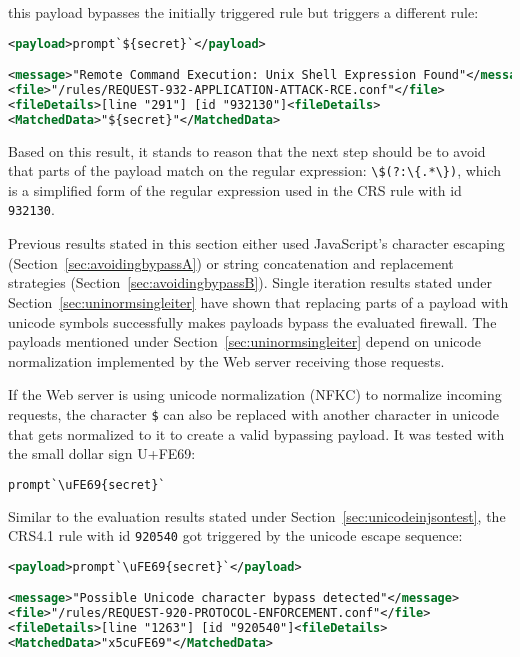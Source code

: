 this payload bypasses the initially triggered rule but triggers a different rule:

\begin{lstlisting}[style=ruleStyle, language=XML]
<payload>prompt`${secret}`</payload>

<message>"Remote Command Execution: Unix Shell Expression Found"</message>
<file>"/rules/REQUEST-932-APPLICATION-ATTACK-RCE.conf"</file>
<fileDetails>[line "291"] [id "932130"]<fileDetails>
<MatchedData>"${secret}"</MatchedData>
\end{lstlisting}

Based on this result, it stands to reason that the next step should be to avoid that parts of the payload match on the regular expression: \verb|\$(?:\{.*\})|, which is a simplified form of the regular expression used in the CRS rule with id \verb|932130|.

Previous results stated in this section either used JavaScript's character escaping (Section~\ref{sec:avoidingbypassA}) or string concatenation and replacement strategies (Section~\ref{sec:avoidingbypassB}). Single iteration results stated under Section~\ref{sec:uninormsingleiter} have shown that replacing parts of a payload with unicode symbols successfully makes payloads bypass the evaluated firewall. The payloads mentioned under Section~\ref{sec:uninormsingleiter} depend on unicode normalization implemented by the Web server receiving those requests. 

If the Web server is using unicode normalization (NFKC) to normalize incoming requests, the character \verb|$| can also be replaced with another character in unicode that gets normalized to it to create a valid bypassing payload. It was tested with the small dollar sign U+FE69: 

\begin{lstlisting}[style=basicStyle, language=Python]
prompt`\uFE69{secret}`
\end{lstlisting}

Similar to the evaluation results stated under Section~\ref{sec:unicodeinjsontest}, the CRS4.1 rule with id \verb|920540| got triggered by the unicode escape sequence:

\begin{lstlisting}[style=ruleStyle, language=XML]
<payload>prompt`\uFE69{secret}`</payload>

<message>"Possible Unicode character bypass detected"</message>
<file>"/rules/REQUEST-920-PROTOCOL-ENFORCEMENT.conf"</file>
<fileDetails>[line "1263"] [id "920540"]<fileDetails>
<MatchedData>"x5cuFE69"</MatchedData>
\end{lstlisting}

